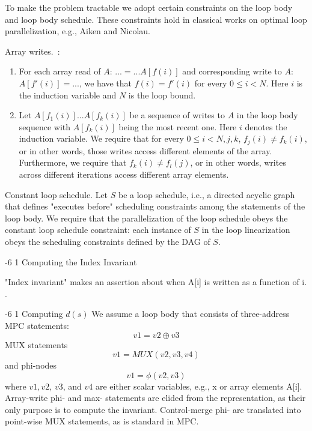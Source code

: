 \documentclass[sigconf, screen, natbib=false, dvipsnames, table]{acmart}
\makeatletter
\renewcommand{\subsubsection}{\@startsection{subsubsection}{3}{\z@}%
                        {-6\p@ \@plus -4\p@ \@minus -4\p@}%
                        {1\p@ \@plus 1\p@ \@minus 0\p@}%
                        {\normalfont\normalsize\bfseries\boldmath}}
\theoremstyle{definition}
\makeatother
\begin{document}
To make the problem tractable we adopt certain constraints on the loop body and loop body schedule.
These constraints hold in classical works on optimal loop parallelization, e.g., Aiken and Nicolau.

Array writes.~:
\begin{enumerate}
\item For each array read of $A$: $... = ... A[f(i)]$ and corresponding write to $A$: $A[f'(i)] = ...$, 
we have that $f(i) = f'(i)$ for every $0 \le i < N$. Here $i$ is the induction variable and $N$ is
the loop bound. 

\item Let $A[f_1(i)]...A[f_k(i)]$ be a sequence of writes to $A$ in the loop body sequence 
 with $A[f_k(i)]$ being the most recent one. Here
$i$ denotes the induction variable. We require that for every $0 \le i < N, j,k$, $f_j(i) \neq f_k(i)$, 
or in other words, those writes access different elements of the array. Furthermore, we require 
that $f_k(i) \neq f_l(j)$, or in other words, writes across different iterations access different array 
elements. 
\end{enumerate}

Constant loop schedule. Let $S$ be a loop schedule, i.e., a directed acyclic graph that defines "executes before"
scheduling constraints among the statements of the loop body. We require that the 
parallelization of the loop schedule obeys the constant loop schedule constraint: each instance of $S$
in the loop linearization obeys the scheduling constraints defined by the DAG of $S$. 

\subsubsection{Computing the Index Invariant} 

"Index invariant" makes an assertion about when A[i] is written as a function of i.
. 

\subsubsection{Computing $d(s)$}
We assume a loop body that consists of three-address MPC statements:
\[ v1 = v2 \oplus v3 \]
MUX statements
\[ v1 = MUX(v2, v3, v4) \]
and
phi-nodes
\[ v1 = \phi(v2, v3) \]
where $v1,v2$, $v3$, and $v4$ are either scalar variables, e.g., {\sf x} or array elements {\sf A[i]}.
Array-write phi- and max- statements are elided from the representation, as
their only purpose is to compute the invariant. Control-merge phi- are translated
into point-wise MUX statements, as is standard in MPC.  
\end{document}
